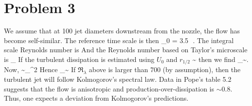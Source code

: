 \documentclass[11pt]{article}
\begin{document}
\section*{Problem 3}
     We assume that at 100 jet diameters downstream from the nozzle, the flow has become self-similar. The reference time scale is then
        \beq
        \tau_0  {} = 3.5  \,\,.
        \eeq
    The integral scale Reynolds number is
    \beq
        \Re {} {}\per
    \eeq
    And the Reynolds number based on Taylor's microscale is
    \beq
        \Re_{\lambda}  {}\per
    \eeq
    If the turbulent dissipation is estimated using $U_0$ and $r_{1/2}$
    \beq
        \epsilon \sim {}\com
    \eeq
    then we find
    \beq
    \Re_{\lambda}\sim{}.
    \eeq
    Now,
    \beq
    \nu \sim \epsilon \tau_{\eta}^2\per
    \eeq
   Hence
   \beq
   \Re_{\lambda}\sim {}\per
   \eeq
    If $\Re_\lambda$ above is larger than 700 (by assumption), then the turbulent jet will follow 
     Kolmogorov's spectral law. Data in Pope's table 5.2 suggests that the flow is anisotropic and
      production-over-dissipation is $\sim 0.8$. Thus, one expects a deviation from Kolmogorov's predictions.


\end{document}
